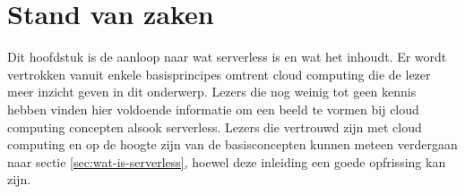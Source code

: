 \chapter{Stand van zaken}
\label{ch:stand-van-zaken}



%
%

 Dit hoofdstuk is de aanloop naar wat serverless is en wat het inhoudt. Er wordt vertrokken vanuit enkele basisprincipes omtrent cloud computing die de lezer meer inzicht geven in dit onderwerp. Lezers die nog weinig tot geen kennis hebben vinden hier voldoende informatie om een beeld te vormen bij cloud computing concepten alsook serverless. Lezers die vertrouwd zijn met cloud computing en op de hoogte zijn van de basisconcepten kunnen meteen verdergaan naar sectie \ref{sec:wat-is-serverless}, hoewel deze inleiding een goede opfrissing kan zijn.
 
